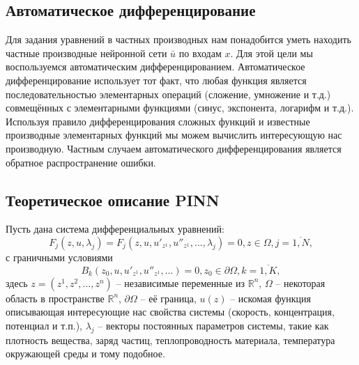 \documentclass[a4paper,14pt]{extarticle} %
\begin{document}
\subsection{Автоматическое дифференцирование}

Для задания уравнений в частных производных нам понадобится уметь находить частные производные нейронной сети $\bar{u}$ по входам $x$. Для этой цели мы воспользуемся автоматическим дифференцированием. Автоматическое дифференцирование использует тот факт, что любая функция является последовательностью элементарных операций (сложение, умножение и т.д.) совмещённых с элементарными функциями (синус, экспонента, логарифм и т.д.). Используя правило дифференцирования сложных функций и известные производные элементарных функций мы можем вычислить интересующую нас производную. Частным случаем автоматического дифференцирования является обратное распространение ошибки.

\subsection{Теоретическое описание PINN}

Пусть дана система дифференциальных уравнений:
\begin{equation}\label{eq:1syst}
    F_j(z, u, \lambda_j) = F_j(z, u, u'_{z^1}, u''_{z^1}, ..., \lambda_j) = 0, z\in\Omega, j=\overline{1,N},
\end{equation}
с граничными условиями
\begin{equation}\label{eq:1bnd}
    B_k(z_0, u, u'_{z^1}, u''_{z^1}, ...) = 0, z_0 \in \partial\Omega, k=\overline{1,K},
\end{equation}
здесь $z = (z^1, z^2, ... ,z^n)$ -- независимые переменные из $\mathbb{R}^n$, $\Omega$ -- некоторая область в пространстве $\mathbb{R}^n$, $\partial\Omega$ -- её граница, $u(z)$ -- искомая функция описывающая интересующие нас свойства системы (скорость, концентрация, потенциал и т.п.), $\lambda_j$ -- векторы постоянных параметров системы, такие как плотность вещества, заряд частиц, теплопроводность материала, температура окружающей среды и тому подобное.


\end{document}
